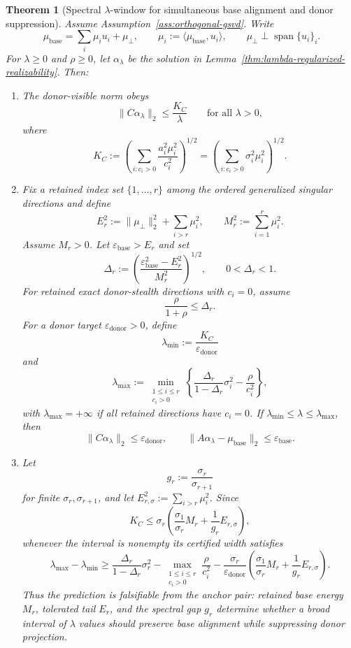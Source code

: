 \documentclass{article}
\theoremstyle{plain}
\newtheorem{theorem}{Theorem}[section]
\theoremstyle{definition}
\theoremstyle{remark}
\begin{document}
\begin{theorem}[Spectral $\lambda$-window for simultaneous base alignment and donor suppression]
\label{thm:wide-lambda-window}
Assume Assumption~\ref{ass:orthogonal-gsvd}. Write
\[
\mu_{\text{base}}=\sum_i \mu_i u_i+\mu_\perp,
\qquad
\mu_i:=\langle \mu_{\text{base}},u_i\rangle,
\qquad
\mu_\perp\perp\operatorname{span}\{u_i\}_i.
\]
For $\lambda\ge 0$ and $\rho\ge 0$, let $\alpha_\lambda$ be the solution in Lemma~\ref{thm:lambda-regularized-realizability}. Then:
\begin{enumerate}[leftmargin=*]
\item The donor-visible norm obeys
\[
\|C\alpha_\lambda\|_2
\le
\frac{K_C}{\lambda}
\qquad
\text{for all }\lambda>0,
\]
where
\[
K_C:=\left(\sum_{i:c_i>0}\frac{a_i^2\mu_i^2}{c_i^2}\right)^{1/2}
=
\left(\sum_{i:c_i>0}\sigma_i^2\mu_i^2\right)^{1/2}.
\]
\item Fix a retained index set $\{1,\ldots,r\}$ among the ordered generalized singular directions and define
\[
E_r^2:=\|\mu_\perp\|_2^2+
\sum_{i>r}\mu_i^2,
\qquad
M_r^2:=\sum_{i=1}^{r}\mu_i^2.
\]
Assume $M_r>0$. Let $\varepsilon_{\text{base}}>E_r$ and set
\[
\Delta_r:=\left(\frac{\varepsilon_{\text{base}}^2-E_r^2}{M_r^2}\right)^{1/2},
\qquad
0<\Delta_r<1.
\]
For retained exact donor-stealth directions with $c_i=0$, assume
\[
\frac{\rho}{1+\rho}\le \Delta_r.
\]
For a donor target $\varepsilon_{\text{donor}}>0$, define
\[
\lambda_{\min}:=\frac{K_C}{\varepsilon_{\text{donor}}}
\]
and
\[
\lambda_{\max}:=
\min_{\substack{1\le i\le r\\ c_i>0}}
\left\{
\frac{\Delta_r}{1-\Delta_r}\sigma_i^2-\frac{\rho}{c_i^2}
\right\},
\]
with $\lambda_{\max}=+\infty$ if all retained directions have $c_i=0$. If $\lambda_{\min}\le \lambda\le \lambda_{\max}$, then
\[
\|C\alpha_\lambda\|_2\le \varepsilon_{\text{donor}},
\qquad
\|A\alpha_\lambda-\mu_{\text{base}}\|_2\le \varepsilon_{\text{base}}.
\]
\item Let
\[
g_r:=\frac{\sigma_r}{\sigma_{r+1}}
\]
for finite $\sigma_r,\sigma_{r+1}$, and let $E_{r,\sigma}^2:=\sum_{i>r}\mu_i^2$. Since
\[
K_C
\le
\sigma_r\left(\frac{\sigma_1}{\sigma_r}M_r+\frac{1}{g_r}E_{r,\sigma}\right),
\]
whenever the interval is nonempty its certified width satisfies
\[
\lambda_{\max}-\lambda_{\min}
\ge
\frac{\Delta_r}{1-\Delta_r}\sigma_r^2
-
\max_{\substack{1\le i\le r\\ c_i>0}}\frac{\rho}{c_i^2}
-
\frac{\sigma_r}{\varepsilon_{\text{donor}}}
\left(\frac{\sigma_1}{\sigma_r}M_r+\frac{1}{g_r}E_{r,\sigma}\right).
\]
Thus the prediction is falsifiable from the anchor pair: retained base energy $M_r$, tolerated tail $E_r$, and the spectral gap $g_r$ determine whether a broad interval of $\lambda$ values should preserve base alignment while suppressing donor projection.
\end{enumerate}
\end{theorem}
\end{document}
